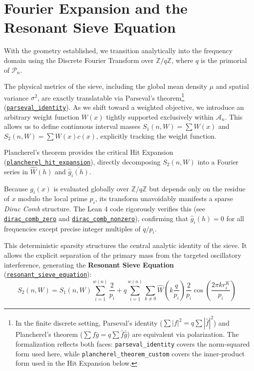 \documentclass[lean]{AFM}
\renewcommand{\.}{\hskip .75pt}
\def\urlpfx{https://github.com/ElNando888/KrafftSieve/blob/v1.0}
\begin{document}
\section{Fourier Expansion and the Resonant Sieve Equation} \label{resonance}

With the geometry established, we transition analytically into the frequency domain using the
Discrete Fourier Transform over $\mathbb{Z}/q\mathbb{Z}$, where $q$ is the primorial of
$\mathcal{P}_n$. 

The physical metrics of the sieve, including the global mean density $\mu$ and spatial variance
$\sigma^2$, are exactly translatable via Parseval's theorem\footnote{In the finite discrete
setting, Parseval's identity ($\sum |f|^2 = q\sum |\hat{f}|^2$) and Plancherel's theorem
($\sum f\bar{g} = q\sum \hat{f}\bar{\hat{g}}$) are equivalent via polarization. The
formalization reflects both faces: \texttt{parseval\_identity} covers the norm-squared form
used here, while \texttt{plancherel\_theorem\_custom} covers the inner-product form used in
the Hit Expansion below.}
(\href{\urlpfx/KrafftSieve/Variance.lean#L224}{\texttt{parseval\_identity}}). As we shift toward
a weighted objective, we introduce an arbitrary weight function $W(x)$ tightly supported
exclusively within $\mathcal{A}_n$. This allows us to define continuous interval masses
$S_1(n, W) = \sum W(x)$ and $S_2(n, W) = \sum W(x)c(x)$, explicitly tracking the weight function.

Plancherel's theorem provides the critical Hit Expansion
(\href{\urlpfx/KrafftSieve/ThirdHarmonic.lean#L192}{\texttt{plancherel\_hit\_expansion}}),
directly decomposing $S_2(n, W)$ into a Fourier series in $\hat{W}(h)$ and
$\overline{\hat{g}_i(h)}$.

Because $g_i(x)$ is evaluated globally over $\mathbb{Z}/q\mathbb{Z}$ but depends only on the
residue of $x$ modulo the local prime $p_i$, its transform unavoidably manifests a sparse
\textit{Dirac Comb} structure. The Lean 4 code rigorously verifies this
(see \href{\urlpfx/KrafftSieve/ThirdHarmonic.lean#L438}{\texttt{dirac\_comb\_zero}} and
\href{\urlpfx/KrafftSieve/ThirdHarmonic.lean#L215}{\texttt{dirac\_comb\_nonzero}}), confirming that
$\hat{g}_i(h) = 0$ for all frequencies except precise integer multiples of $q/p_i$.

This deterministic sparsity structures the central analytic identity of the sieve. It allows the
explicit separation of the primary mass from the targeted oscillatory interference, generating the
\textbf{Resonant Sieve Equation} (\href{\urlpfx/KrafftSieve/ThirdHarmonic.lean#L614}
{\texttt{resonant\_sieve\_equation}}):
$$ S_2(n, W) = S_1(n, W) \sum_{i=1}^{w(n)} \frac{2}{p_i} + q \sum_{i=1}^{w(n)} \sum_{k \neq 0}
\hat{W}\!\left(k \frac{q}{p_i}\right) \frac{2}{p_i} \cos\!\left( \frac{2 \pi k r^K_i}{p_i} \right) $$
\end{document}
